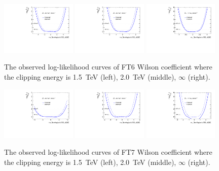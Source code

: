 \begin{figure}[ht]
    \centering
    \includegraphics[width=0.32\textwidth]{figures/aQGC/profileFT61500}
    	\includegraphics[width=0.32\textwidth]{figures/aQGC/profileFT62000}
        \includegraphics[width=0.32\textwidth]{figures/aQGC/profileFT6inf}
        \caption{The observed log-likelihood curves of FT6 Wilson coefficient where the clipping energy is 1.5~TeV (left), 2.0~TeV (middle), $\infty$ (right).}
        \label{fig:ProfileLL}
\end{figure}
\begin{figure}[ht]
    \centering
    \includegraphics[width=0.32\textwidth]{figures/aQGC/profileFT71500}
    	\includegraphics[width=0.32\textwidth]{figures/aQGC/profileFT72000}
        \includegraphics[width=0.32\textwidth]{figures/aQGC/profileFT7inf}
        \caption{The observed log-likelihood curves of FT7 Wilson coefficient where the clipping energy is 1.5~TeV (left), 2.0~TeV (middle), $\infty$ (right).}
        \label{fig:ProfileLL}
\end{figure}

